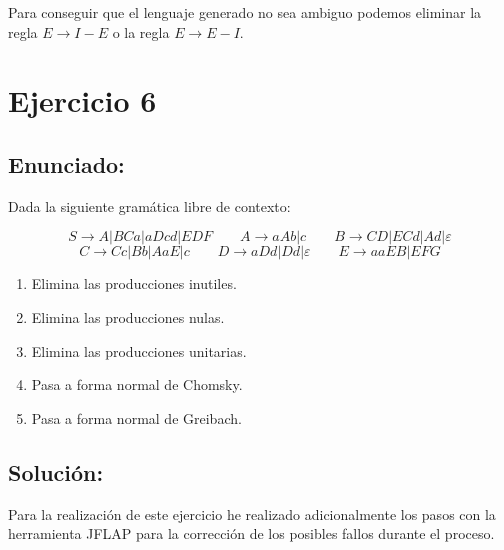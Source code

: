 \documentclass[10pt,a4paper,spanish]{report}
\begin{document}
\noindent
Para conseguir que el lenguaje generado no sea ambiguo podemos eliminar la regla $E \rightarrow I-E$ o la regla $E \rightarrow E-I$.


\chapter{Ejercicio 6}

\section{Enunciado:}

\noindent
Dada la siguiente gramática libre de contexto:

\begin{displaymath}
	S \rightarrow A | BCa | aDcd | EDF \qquad A \rightarrow aAb | c \qquad B \rightarrow CD | ECd | Ad | \varepsilon
\end{displaymath}
\begin{displaymath}
	C \rightarrow Cc | Bb | AaE | c \qquad D \rightarrow aDd | Dd | \varepsilon \qquad E \rightarrow aaEB | EFG
\end{displaymath}


\begin{enumerate}
	\item Elimina las producciones inutiles.
	\item Elimina las producciones nulas.
	\item Elimina las producciones unitarias.
	\item Pasa a forma normal de Chomsky.
	\item Pasa a forma normal de Greibach.
\end{enumerate}

\section{Solución:}

\noindent
Para la realización de este ejercicio he realizado adicionalmente los pasos con la herramienta JFLAP para la corrección de los posibles fallos durante el proceso.
\end{document}

